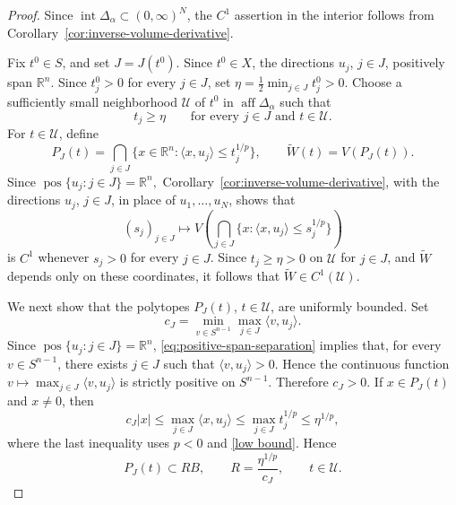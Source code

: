 \documentclass[10pt,a4paper]{amsart}
\newcommand{\R}{\mathbb R}
\DeclareMathOperator{\pos}{pos}
\begin{document}
\begin{proof}
	Since
	\(\operatorname{int}\Delta_\alpha\subset(0,\infty)^N\), the
	\(C^1\) assertion in the interior follows from
	Corollary~\ref{cor:inverse-volume-derivative}.
	
	Fix \(t^0\in S\), and set \(J=J(t^0)\). Since \(t^0\in X\), the
	directions \(u_j\), \(j\in J\), positively span \(\R^n\). 
	Since \(t_j^0>0\) for every \(j\in J\), set
	\(
	\eta=\frac12\min_{j\in J}t_j^0>0.
	\)
	Choose a sufficiently small neighborhood \(\mathcal U\) of \(t^0\)
	in \(\operatorname{aff}\Delta_\alpha\) such that
	\begin{equation}\label{low bound}
	t_j\geq\eta
	\qquad
	\text{for every }j\in J\text{ and }t\in\mathcal U.
	\end{equation}
	For \(t\in\mathcal U\), define
	\[
	P_J(t)
	=
	\bigcap_{j\in J}
	\{x\in\R^n:\langle x,u_j\rangle\leq t_j^{1/p}\},
	\qquad
	\widetilde W(t)=V(P_J(t)).
	\]
	Since
	\(
	\pos\{u_j:j\in J\}=\R^n,
	\)
	Corollary~\ref{cor:inverse-volume-derivative}, with the directions
	\(u_j\), \(j\in J\), in place of \(u_1,\ldots,u_N\), shows that
	\[
	(s_j)_{j\in J}
	\longmapsto
	V\left(
	\bigcap_{j\in J}
	\{x:\langle x,u_j\rangle\leq s_j^{1/p}\}
	\right)
	\]
	is \(C^1\) whenever \(s_j>0\) for every \(j\in J\).
	Since \(t_j\geq\eta>0\) on \(\mathcal U\) for \(j\in J\), and
	\(\widetilde W\) depends only on these coordinates, it follows that
	\(\widetilde W\in C^1(\mathcal U)\).
	
	
	
We next show that the polytopes \(P_J(t)\), \(t\in\mathcal U\),
are uniformly bounded. Set
	\[
	c_J
	=
	\min_{v\in S^{n-1}}
	\max_{j\in J}\langle v,u_j\rangle.
	\]
	Since
	\(\pos\{u_j:j\in J\}=\R^n\), 
	\eqref{eq:positive-span-separation} implies that, for every
	\(v\in S^{n-1}\), there exists \(j\in J\) such that
	\(\langle v,u_j\rangle>0\). Hence the continuous function
	\(
	v\longmapsto \max_{j\in J}\langle v,u_j\rangle
	\)
	is strictly positive on  \(S^{n-1}\). Therefore
	\(
	c_J
	>0
	\).
	 If
	\(x\in P_J(t)\) and \(x\neq0\), then
	\[
	c_J|x|
	\leq
	\max_{j\in J}\langle x,u_j\rangle
	\leq
	\max_{j\in J}t_j^{1/p}
	\leq
	\eta^{1/p},
	\]
	where the last inequality uses \(p<0\) and \eqref{low bound}. Hence
	\[
	P_J(t)\subset RB,
	\qquad
	R=\frac{\eta^{1/p}}{c_J},
	\qquad
	t\in\mathcal U.
	\]
	

\end{proof}
\end{document}
